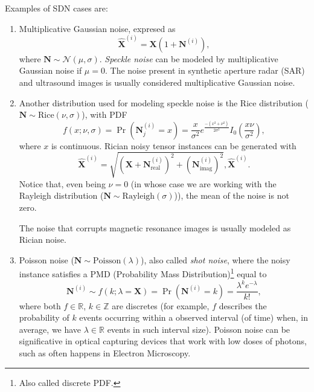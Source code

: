 \documentclass{article}
\begin{document}
Examples of SDN cases are:
\begin{enumerate}
\item Multiplicative Gaussian noise, expresed as
  \begin{equation}
    \hat{\mathbf X}^{(i)} = {\mathbf X} (1 + {\mathbf N}^{(i)}),
    \label{eq:MGN}
  \end{equation}
  where ${\mathbf N}\sim{\mathcal N}(\mu,\sigma)$. \emph{Speckle
    noise} can be modeled by multiplicative Gaussian noise if
  $\mu=0$. The noise present in synthetic aperture radar (SAR) and
  ultrasound images is usually considered multiplicative Gaussian
  noise.

\item Another distribution used for modeling speckle noise is the Rice
  distribution ($\mathbf{N}\sim\mathrm{Rice}(\nu,\sigma)$), with PDF
  \begin{equation}
    f(x; \nu,\sigma) = \Pr({\mathbf N}^{(i)}_j{=}x) = \frac{x}{\sigma^2}e^{\frac{-(x^2+\nu^2)}{2\sigma^2}}I_0\left(\frac{x\nu}{\sigma^2}\right),
  \end{equation}
  where $x$ is continuous. Rician noisy tensor instances can be generated with
  \begin{equation}
    \hat{\mathbf X}^{(i)} = \sqrt{ ({\mathbf X} + {\mathbf N}_{\text{real}}^{(i)})^2 + ({\mathbf N}_{\text{imag}}^{(i)})^2}, \hat{\mathbf X}^{(i)}.
  \end{equation}
  Notice that, even being $\nu=0$ (in whose case we are
  working with the Rayleigh distribution
  ($\mathbf{N}\sim\mathrm{Rayleigh}(\sigma)$)), the mean of the noise is not zero.

  The noise that corrupts magnetic resonance images is usually modeled as Rician noise.

\item Poisson noise ($\mathbf{N}\sim\mathrm{Poisson}(\lambda)$), also
  called \emph{shot noise}, where the noisy instance satisfies a PMD
  (Probability Mass Distribution)\footnote{Also called discrete PDF.}
  equal to
  \begin{equation}
    {\mathbf N}^{(i)} \sim f(k; \lambda={\mathbf X}) = \Pr({\mathbf N}^{(i)}{=}k) = \frac{\lambda^k e^{-\lambda}}{k!},
    \label{eq:PN}
  \end{equation}
  where both $f\in\mathbb{R}$, $k\in\mathbb{Z}$ are discretes (for
  example, $f$ describes the probability of $k$ events occurring
  within a observed interval (of time) when, in average,
  we have $\lambda\in\mathbb{R}$ events in such interval
  size). Poisson noise can be significative in optical capturing
  devices that work with low doses of photons, such as often happens
  in Electron Microscopy.


\end{enumerate}
\end{document}
